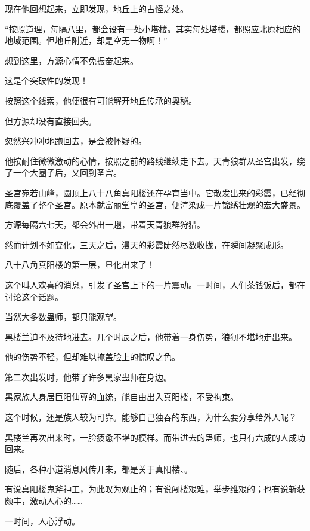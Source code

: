\begin{this_body}
现在他回想起来，立即发现，地丘上的古怪之处。

“按照道理，每隔八里，都会设有一处小塔楼。其实每处塔楼，都照应北原相应的地域范围。但地丘附近，却是空无一物啊！”

想到这里，方源心情不免振奋起来。

这是个突破性的发现！

按照这个线索，他便很有可能解开地丘传承的奥秘。

但方源却没有直接回头。

忽然兴冲冲地跑回去，是会被怀疑的。

他按耐住微微激动的心情，按照之前的路线继续走下去。天青狼群从圣宫出发，绕了一个大圈子后，又回到圣宫。

圣宫宛若山峰，圆顶上八十八角真阳楼还在孕育当中。它散发出来的彩霞，已经彻底覆盖了整个圣宫。原本就富丽堂皇的圣宫，便渲染成一片锦绣壮观的宏大盛景。

方源每隔六七天，都会外出一趟，带着天青狼群狩猎。

然而计划不如变化，三天之后，漫天的彩霞陡然尽数收拢，在瞬间凝聚成形。

八十八角真阳楼的第一层，显化出来了！

这个叫人欢喜的消息，引发了圣宫上下的一片震动。一时间，人们茶钱饭后，都在讨论这个话题。

当然大多数蛊师，都只能观望。

黑楼兰迫不及待地进去。几个时辰之后，他带着一身伤势，狼狈不堪地走出来。

他的伤势不轻，但却难以掩盖脸上的惊叹之色。

第二次出发时，他带了许多黑家蛊师在身边。

黑家族人身居巨阳仙尊的血统，能自由出入真阳楼，不受拘束。

这个时候，还是族人较为可靠。能够自己独吞的东西，为什么要分享给外人呢？

黑楼兰再次出来时，一脸疲惫不堪的模样。而带进去的蛊师，也只有六成的人成功回来。

随后，各种小道消息风传开来，都是关于真阳楼、。

有说真阳楼鬼斧神工，为此叹为观止的；有说闯楼艰难，举步维艰的；也有说斩获颇丰，激动人心的……

一时间，人心浮动。

\end{this_body}

